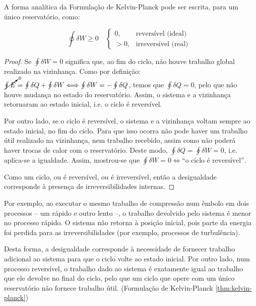 A forma analítica da Formulação de Kelvin-Planck pode ser escrita, para um único reservatório, como:

\begin{equation}
    \oint \delta W \geq 0 \quad
    \begin{cases}
        0, & \text{reversível (ideal)} \\
        > 0, & \text{irreversível (real)}
    \end{cases}
\end{equation}

\begin{proof}
    Se $\oint \delta W = 0$ significa que, ao fim do ciclo, não houve trabalho global realizado na vizinhança. Como por definição: $\cancelto{0}{\oint E} = \oint \delta Q + \oint \delta W \Longleftrightarrow \oint \delta W = - \oint \delta Q$, temos que $\oint \delta Q =0$, pelo que não houve mudança no estado do reservatório. Assim, o sistema e a vizinhança retornaram ao estado inicial, i.e. o ciclo é reversível.
    
    Por outro lado, se o ciclo é reversível, o sistema e a vizinhança voltam sempre ao estado inicial, no fim do ciclo. Para que isso ocorra não pode haver um trabalho útil realizado na vizinhança, nem trabalho recebido, assim como não poderá haver trocas de calor com o reservatório. Deste modo, $\oint \delta Q = \oint \delta W = 0$, i.e. aplica-se a igualdade. Assim, mostrou-se que $\oint \delta W = 0 \Longleftrightarrow \text{``o ciclo é reversível''}$.
    
    Como um ciclo, ou é reversível, ou é irreversível, então a desigualdade corresponde à presença de irreversibilidades internas.
\end{proof}

Por exemplo, ao executar o mesmo trabalho de compressão num êmbolo em dois processos -- um rápido e outro lento --, o trabalho devolvido pelo sistema é menor no processo rápido. O sistema não retorna à posição inicial, pois parte da energia foi perdida para as irreversibilidades (por exemplo, processos de turbulência).

Desta forma, a desigualdade corresponde à necessidade de fornecer trabalho adicional ao sistema para que o ciclo volte ao estado inicial. Por outro lado, num processo reversível, o trabalho dado ao sistema é exatamente igual ao trabalho que ele devolve no final do ciclo, pelo que um ciclo que opere com um único reservatório não fornece trabalho útil. (Formulação de Kelvin-Planck \autoref{thm:kelvin-planck})